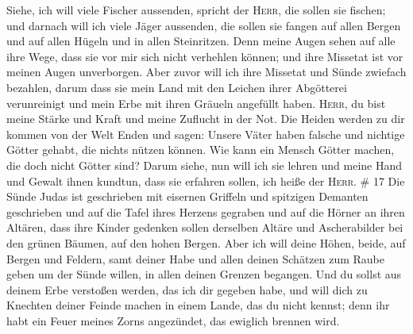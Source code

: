  Siehe, ich will viele Fischer aussenden, spricht der
\textsc{Herr}, die sollen sie fischen; und darnach will ich viele Jäger
aussenden, die sollen sie fangen auf allen Bergen und auf allen Hügeln
und in allen Steinritzen.  Denn meine Augen sehen auf
alle ihre Wege, dass sie vor mir sich nicht verhehlen können; und ihre
Missetat ist vor meinen Augen unverborgen.  Aber zuvor
will ich ihre Missetat und Sünde zwiefach bezahlen, darum dass sie mein
Land mit den Leichen ihrer Abgötterei verunreinigt und mein Erbe mit
ihren Gräueln angefüllt haben.  \textsc{Herr}, du bist
meine Stärke und Kraft und meine Zuflucht in der Not. Die Heiden werden
zu dir kommen von der Welt Enden und sagen: Unsere Väter haben falsche
und nichtige Götter gehabt, die nichts nützen können. 
Wie kann ein Mensch Götter machen, die doch nicht Götter sind?
 Darum siehe, nun will ich sie lehren und meine Hand und
Gewalt ihnen kundtun, dass sie erfahren sollen, ich heiße der
\textsc{Herr}. \# 17  Die Sünde Judas ist geschrieben mit
eisernen Griffeln und spitzigen Demanten geschrieben und auf die Tafel
ihres Herzens gegraben und auf die Hörner an ihren Altären,
 dass ihre Kinder gedenken sollen derselben Altäre und
Ascherabilder bei den grünen Bäumen, auf den hohen Bergen.
 Aber ich will deine Höhen, beide, auf Bergen und Feldern,
samt deiner Habe und allen deinen Schätzen zum Raube geben um der Sünde
willen, in allen deinen Grenzen begangen.  Und du sollst
aus deinem Erbe verstoßen werden, das ich dir gegeben habe, und will
dich zu Knechten deiner Feinde machen in einem Lande, das du nicht
kennst; denn ihr habt ein Feuer meines Zorns angezündet, das ewiglich
brennen wird.

